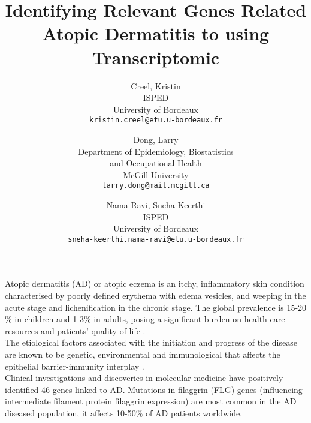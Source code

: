 \documentclass[journal, a4paper]{IEEEtran}
\begin{document}
\title{\Large{Identifying Relevant Genes Related Atopic Dermatitis  to  using Transcriptomic}}
\author{%
\begin{tabular}{c} Creel, Kristin \\ ISPED \\ University of Bordeaux \\ \texttt{kristin.creel@etu.u-bordeaux.fr} \end{tabular} \and
\begin{tabular}{c} Dong, Larry \\ Department of Epidemiology, Biostatistics \\ and Occupational Health \\ McGill University \\ \texttt{larry.dong@mail.mcgill.ca} \end{tabular} \and
\begin{tabular}{c} Nama Ravi, Sneha Keerthi \\ ISPED \\ University of Bordeaux \\ \texttt{sneha-keerthi.nama-ravi@etu.u-bordeaux.fr} \end{tabular}}
\maketitle





Atopic dermatitis (AD) or atopic eczema is an itchy, inflammatory skin condition characterised by poorly defined erythema with edema vesicles, and weeping in the acute stage and lichenification in the chronic stage. The global prevalence is 15-20 $\%$ in children and 1-3$\%$ in adults, posing a significant burden on health-care resources and patients’ quality of life \cite{nutten2015atopic}.\\

The etiological factors associated with the initiation and progress of the disease are known to be genetic, environmental and immunological that affects the epithelial barrier-immunity interplay \cite{peng2015pathogenesis}.\\

Clinical investigations and discoveries in molecular medicine have positively identified 46 genes linked to AD. Mutations in filaggrin (FLG) genes (influencing intermediate filament protein filaggrin expression) are most common in the AD diseased population, it affects 10-50$\%$ of AD patients worldwide.\\
\end{document}

